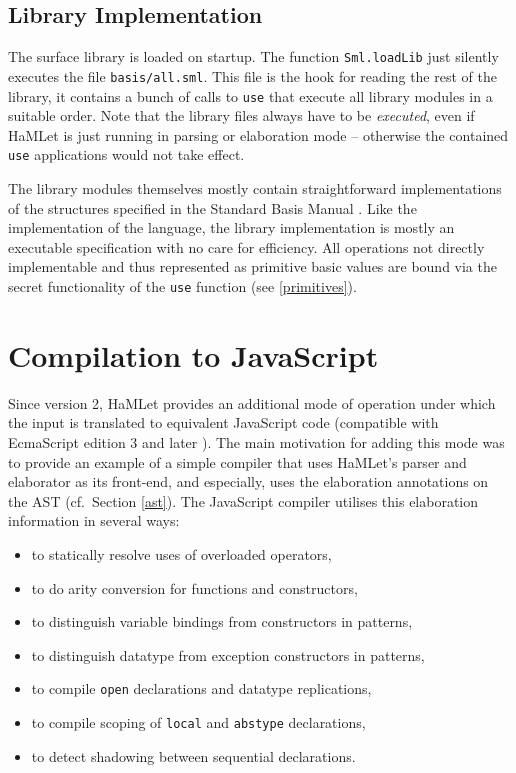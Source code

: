 \documentclass[twoside,titlepage]{article}
\newcommand{\void}[1]{}
\begin{document}
\subsection{Library Implementation}
\label{basis}

The surface library is loaded on startup\void{ (or during built in the case of SML/NJ)}. The function {\tt Sml.loadLib} just silently executes the file {\tt basis/all.sml}. This file is the hook for reading the rest of the library, it contains a bunch of calls to {\tt use} that execute all library modules in a suitable order. Note that the library files always have to be {\em executed}, even if HaMLet is just running in parsing or elaboration mode -- otherwise the contained {\tt use} applications would not take effect.

The library modules themselves mostly contain straightforward implementations of the structures specified in the Standard Basis Manual \cite{basis}. Like the implementation of the language, the library implementation is mostly an executable specification with no care for efficiency. All operations not directly implementable and thus represented as primitive basic values are bound via the secret functionality of the {\tt use} function (see \ref{primitives}).



\section{Compilation to JavaScript}
\label{javascript}

Since version 2, HaMLet provides an additional mode of operation under which the input is translated to equivalent JavaScript code (compatible with EcmaScript edition 3 and later \cite{ecmascript}).
The main motivation for adding this mode was to provide an example of a simple compiler that uses HaMLet's parser and elaborator as its front-end, and especially, uses the elaboration annotations on the AST (cf.\ Section \ref{ast}). The JavaScript compiler utilises this elaboration information in several ways:

\begin{itemize}[nolistsep]
\item to statically resolve uses of overloaded operators,
\item to do arity conversion for functions and constructors,
\item to distinguish variable bindings from constructors in patterns,
\item to distinguish datatype from exception constructors in patterns,
\item to compile {\tt open} declarations and datatype replications,
\item to compile scoping of {\tt local} and {\tt abstype} declarations,
\item to detect shadowing between sequential declarations.
\end{itemize}
\end{document}

